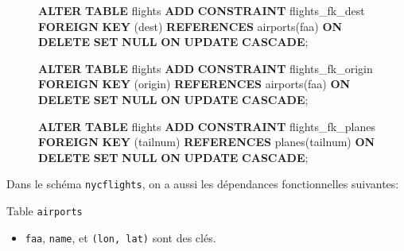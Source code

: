 \documentclass[
  10pt,
  titlepage=false]{exam}
\newenvironment{Shaded}{\begin{snugshade}}{\end{snugshade}}
\newcommand{\KeywordTok}[1]{\textcolor[rgb]{0.00,0.23,0.31}{\textbf{#1}}}
\newcommand{\NormalTok}[1]{\textcolor[rgb]{0.00,0.23,0.31}{#1}}
\providecommand{\tightlist}{%
  \setlength{\itemsep}{0pt}\setlength{\parskip}{0pt}}
\begin{document}
\begin{figure}
\begin{minipage}{0.50\linewidth}
\begin{Shaded}
\begin{Highlighting}[]
\KeywordTok{ALTER} \KeywordTok{TABLE}\NormalTok{ flights }\KeywordTok{ADD} 
    \KeywordTok{CONSTRAINT}\NormalTok{ flights\_fk\_dest }
    \KeywordTok{FOREIGN} \KeywordTok{KEY}\NormalTok{ (dest) }
    \KeywordTok{REFERENCES}\NormalTok{ airports(faa) }
    \KeywordTok{ON} \KeywordTok{DELETE} \KeywordTok{SET} \KeywordTok{NULL} 
    \KeywordTok{ON} \KeywordTok{UPDATE} \KeywordTok{CASCADE}\NormalTok{;}
\end{Highlighting}
\end{Shaded}

\begin{Shaded}
\begin{Highlighting}[]
\KeywordTok{ALTER} \KeywordTok{TABLE}\NormalTok{ flights }\KeywordTok{ADD} 
    \KeywordTok{CONSTRAINT}\NormalTok{ flights\_fk\_origin }
    \KeywordTok{FOREIGN} \KeywordTok{KEY}\NormalTok{ (origin) }
    \KeywordTok{REFERENCES}\NormalTok{ airports(faa) }
    \KeywordTok{ON} \KeywordTok{DELETE} \KeywordTok{SET} \KeywordTok{NULL} 
    \KeywordTok{ON} \KeywordTok{UPDATE} \KeywordTok{CASCADE}\NormalTok{;}
\end{Highlighting}
\end{Shaded}

\begin{Shaded}
\begin{Highlighting}[]
\KeywordTok{ALTER} \KeywordTok{TABLE}\NormalTok{ flights }\KeywordTok{ADD} 
    \KeywordTok{CONSTRAINT}\NormalTok{ flights\_fk\_planes }
    \KeywordTok{FOREIGN} \KeywordTok{KEY}\NormalTok{ (tailnum) }
    \KeywordTok{REFERENCES}\NormalTok{ planes(tailnum) }
    \KeywordTok{ON} \KeywordTok{DELETE} \KeywordTok{SET} \KeywordTok{NULL} 
    \KeywordTok{ON} \KeywordTok{UPDATE} \KeywordTok{CASCADE}\NormalTok{;}
\end{Highlighting}
\end{Shaded}

\end{minipage}%

\end{figure}%

Dans le schéma \texttt{nycflights}, on a aussi les dépendances
fonctionnelles suivantes:

Table \texttt{airports}

\begin{itemize}
\tightlist
\item
  \texttt{faa}, \texttt{name}, et \texttt{(lon,\ lat)} sont des clés.
\end{itemize}
\end{document}
